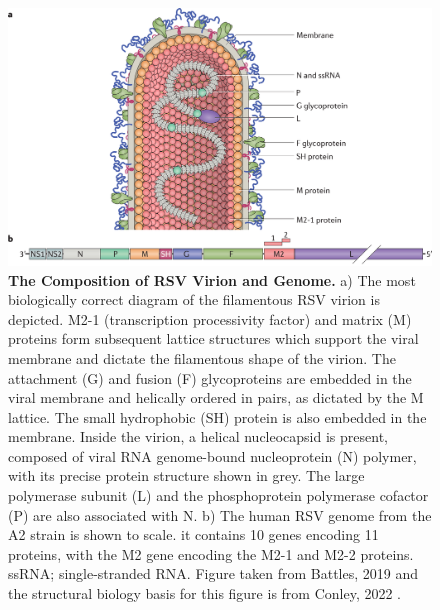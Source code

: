\begin{figure}
    \centering
    \includegraphics[width=1\linewidth]{04. Introduction//Figs/07. RSV-composition.png}
    \caption[The Composition of RSV Virion and Genome.]{\textbf{The Composition of RSV Virion and Genome.} a) The most biologically correct diagram of the filamentous RSV virion is depicted. M2-1 (transcription processivity factor) and matrix (M) proteins form subsequent lattice structures which support the viral membrane and dictate the filamentous shape of the virion. The attachment (G) and fusion (F) glycoproteins are embedded in the viral membrane and helically ordered in pairs, as dictated by the M lattice. The small hydrophobic (SH) protein is also embedded in the membrane. Inside the virion, a helical nucleocapsid is present, composed of viral RNA genome-bound nucleoprotein (N) polymer, with its precise protein structure shown in grey. The large polymerase subunit (L) and the phosphoprotein polymerase cofactor (P) are also associated with N. b) The human RSV genome from the A2 strain is shown to scale. it contains 10 genes encoding 11 proteins, with the M2 gene encoding the M2-1 and M2-2 proteins. ssRNA; single-stranded RNA. Figure taken from Battles, 2019 \cite{Battles2019RespiratoryIt} and the structural biology basis for this figure is from Conley, 2022 \cite{Conley2022HelicalVirus}.}
    \label{fig:The Composition of RSV Virion and Genome}
\end{figure}

